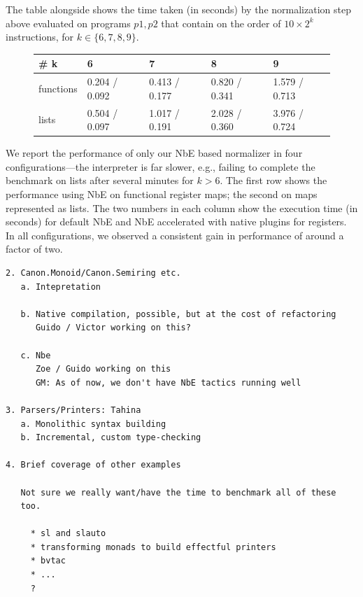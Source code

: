 \documentclass[runningheads]{llncs}
\begin{document}
The table alongside shows the time taken (in seconds) by the
normalization step above evaluated on programs \ls$p1, p2$ that
contain on the order of $10 \times 2^k$ instructions, for $k \in \{6,
7, 8, 9\}$.
%
\setlength\intextsep{-0.5pt}
\begin{figure}
\begin{small}
\begin{tabular}{|l|l|l|l|l|}
\hline
\# k            &  6            & 7           &       8         & 9 \\\hline
functions               & 0.204 / 0.092         & 0.413 / 0.177       & 0.820 / 0.341           & 1.579  / 0.713 \\
lists             &   0.504 / 0.097  &  1.017 / 0.191  &  2.028 / 0.360  &  3.976 / 0.724 \\\hline
\end{tabular}
\end{small}
\end{figure}
%
We report the performance of only our NbE based normalizer in four
configurations---the interpreter is far slower, e.g., failing to
complete the benchmark on lists after several minutes for $k>6$.
%
The first row shows the performance using NbE on functional
register maps; the second on maps represented as lists.
%
The two numbers in each column show the execution time (in seconds) for default NbE
and NbE accelerated with native plugins for registers.
%
In all configurations, we observed a consistent gain in performance of
around a factor of two.


\ifdraft
\begin{verbatim}
2. Canon.Monoid/Canon.Semiring etc.
   a. Intepretation

   b. Native compilation, possible, but at the cost of refactoring
      Guido / Victor working on this?      

   c. Nbe
      Zoe / Guido working on this
      GM: As of now, we don't have NbE tactics running well

3. Parsers/Printers: Tahina
   a. Monolithic syntax building
   b. Incremental, custom type-checking

4. Brief coverage of other examples

   Not sure we really want/have the time to benchmark all of these
   too.

     * sl and slauto
     * transforming monads to build effectful printers
     * bvtac
     * ... 
     ?
\end{verbatim}
\fi
\end{document}
